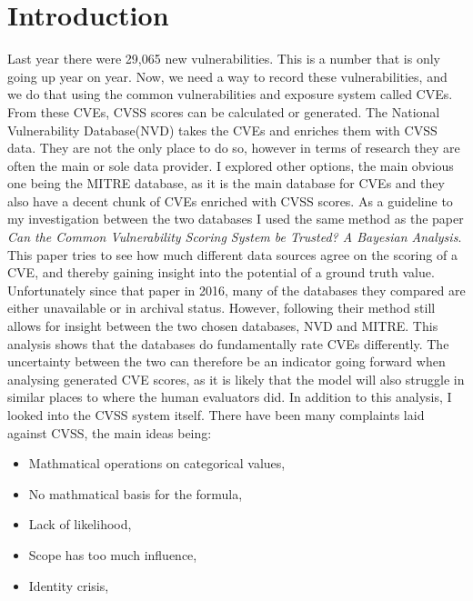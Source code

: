 \documentclass[12pt]{article}
\begin{document}
\section{Introduction}

Last year there were 29,065 new vulnerabilities. This is a number that is only going up year on
year. Now, we need a way to record these vulnerabilities, and we do that using the common
vulnerabilities and exposure system called CVEs. From these CVEs, CVSS scores can be calculated or
generated. The National Vulnerability Database(NVD\cite{NVD}) takes the CVEs and enriches them with
CVSS data. They are not the only place to do so, however in terms of research they are often the
main or sole data provider.\cite{costa}\cite{nvd_example1}\cite{nvd_example2} I explored other
options, the main obvious one being the MITRE\cite{MITRE} database, as it is the main database for
CVEs and they also have a decent chunk of CVEs enriched with CVSS scores. As a guideline to my
investigation between the two databases I used the same method as the paper \textit{Can the Common
	Vulnerability Scoring System be Trusted? A Bayesian Analysis}.\cite{bayes} This paper tries to see
how much different data sources agree on the scoring of a CVE, and thereby gaining insight into the
potential of a ground truth value. Unfortunately since that paper in 2016, many of the databases
they compared are either unavailable or in archival status. However, following their method still
allows for insight between the two chosen databases, NVD and MITRE. This analysis shows that the
databases do fundamentally rate CVEs differently. The uncertainty between the two can therefore be
an indicator going forward when analysing generated CVE scores, as it is likely that the model will
also struggle in similar places to where the human evaluators did. In addition to this analysis, I
looked into the CVSS system itself. There have been many complaints laid against
CVSS\cite{ubiquitous}\cite{improving_cvss}\cite{time_to_change_cvss}, the main ideas being:

\begin{itemize}
	\item Mathmatical operations on categorical values,
	\item No mathmatical basis for the formula,
	\item Lack of likelihood,
	\item Scope has too much influence,
	\item Identity crisis,
\end{itemize}
\end{document}
